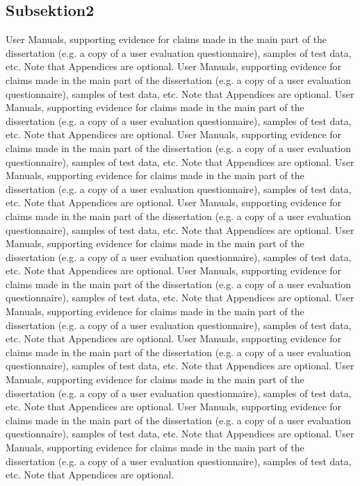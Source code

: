 \begin{appendices}
\subsection{Subsektion2}
User Manuals, supporting evidence for claims made in the main part of the dissertation (e.g. a copy of a user evaluation questionnaire), samples of test data, etc. Note that Appendices are optional.
User Manuals, supporting evidence for claims made in the main part of the dissertation (e.g. a copy of a user evaluation questionnaire), samples of test data, etc. Note that Appendices are optional.
User Manuals, supporting evidence for claims made in the main part of the dissertation (e.g. a copy of a user evaluation questionnaire), samples of test data, etc. Note that Appendices are optional.
User Manuals, supporting evidence for claims made in the main part of the dissertation (e.g. a copy of a user evaluation questionnaire), samples of test data, etc. Note that Appendices are optional.
User Manuals, supporting evidence for claims made in the main part of the dissertation (e.g. a copy of a user evaluation questionnaire), samples of test data, etc. Note that Appendices are optional.
User Manuals, supporting evidence for claims made in the main part of the dissertation (e.g. a copy of a user evaluation questionnaire), samples of test data, etc. Note that Appendices are optional.
User Manuals, supporting evidence for claims made in the main part of the dissertation (e.g. a copy of a user evaluation questionnaire), samples of test data, etc. Note that Appendices are optional.
User Manuals, supporting evidence for claims made in the main part of the dissertation (e.g. a copy of a user evaluation questionnaire), samples of test data, etc. Note that Appendices are optional.
User Manuals, supporting evidence for claims made in the main part of the dissertation (e.g. a copy of a user evaluation questionnaire), samples of test data, etc. Note that Appendices are optional.
User Manuals, supporting evidence for claims made in the main part of the dissertation (e.g. a copy of a user evaluation questionnaire), samples of test data, etc. Note that Appendices are optional.
User Manuals, supporting evidence for claims made in the main part of the dissertation (e.g. a copy of a user evaluation questionnaire), samples of test data, etc. Note that Appendices are optional.
User Manuals, supporting evidence for claims made in the main part of the dissertation (e.g. a copy of a user evaluation questionnaire), samples of test data, etc. Note that Appendices are optional.
User Manuals, supporting evidence for claims made in the main part of the dissertation (e.g. a copy of a user evaluation questionnaire), samples of test data, etc. Note that Appendices are optional.

\end{appendices}
